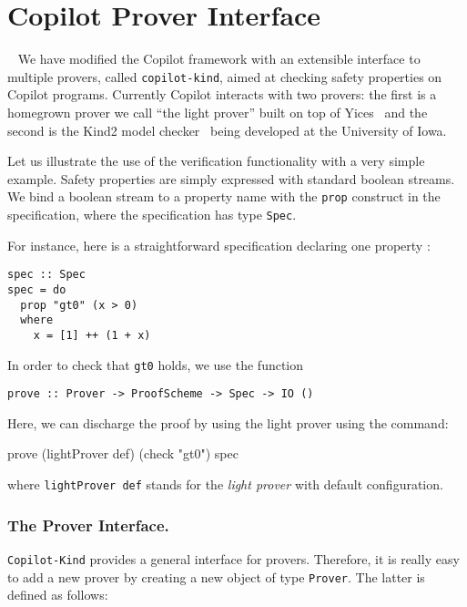 \section{Copilot Prover Interface}~\label{sec:prover} 
We have modified  the Copilot framework with an extensible interface  to multiple
provers, called \texttt{copilot-kind}, aimed at checking  safety properties on Copilot
programs. Currently Copilot interacts with two provers: the first is a
homegrown prover we call ``the light prover'' built on top of
Yices~\cite{Dutertre:cav2014} and the second is the Kind2 model checker~\cite{kind2} being developed at
the University of Iowa.

Let us illustrate the use of the verification functionality with a
very simple example.  Safety properties are simply expressed with
standard boolean streams.  We bind a boolean stream to a property name
with the \texttt{prop} construct in the specification, where the
specification has type \texttt{Spec}.

For instance, here is a straightforward specification declaring one
property :

\begin{lstlisting}[frame=single]
spec :: Spec
spec = do
  prop "gt0" (x > 0)
  where
    x = [1] ++ (1 + x)
\end{lstlisting}

In order  to check that \texttt{gt0} holds, we use
the function

\begin{lstlisting}[frame=single]
    prove :: Prover -> ProofScheme -> Spec -> IO ()
\end{lstlisting}

Here, we can discharge the proof by  using the light prover using the command:
\begin{code}
prove (lightProver def) (check "gt0") spec
\end{code}
where \texttt{lightProver def} stands for the \emph{light prover} with
default configuration.  

\subsubsection{The Prover Interface.}\label{the-prover-interface}

 \texttt{Copilot-Kind} provides a general interface for
provers. Therefore, it is really easy to add a new prover by creating a
new object of type \texttt{Prover}. The latter is defined as follows:

